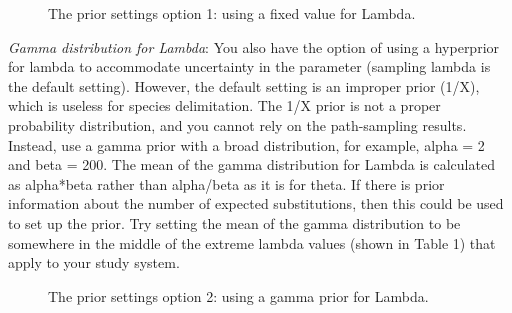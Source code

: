 {    \begin{figure}[htbp]
        \centering
        \caption{The prior settings option 1: using a fixed value for Lambda.}
        \label{fig:beauti-prior}
    \end{figure}   

\textit{Gamma distribution for Lambda}: You also have the option of using a hyperprior for lambda to accommodate uncertainty in the parameter (sampling lambda is the default setting). However, the default setting is an improper prior (1/X), which is useless for species delimitation. The 1/X prior is not a proper probability distribution, and you cannot rely on the path-sampling results. Instead, use a gamma prior with a broad distribution, for example, alpha = 2 and beta = 200. The mean of the gamma distribution for Lambda is calculated as alpha*beta rather than alpha/beta as it is for theta. If there is prior information about the number of expected substitutions, then this could be used to set up the prior. Try setting the mean of the gamma distribution to be somewhere in the middle of the extreme lambda values (shown in Table 1) that apply to your study system. 

    \begin{figure}[htbp]
        \centering
        \caption{The prior settings option 2: using a gamma prior for Lambda.}
        \label{fig:beauti-prior2}
    \end{figure}   
    
    }

